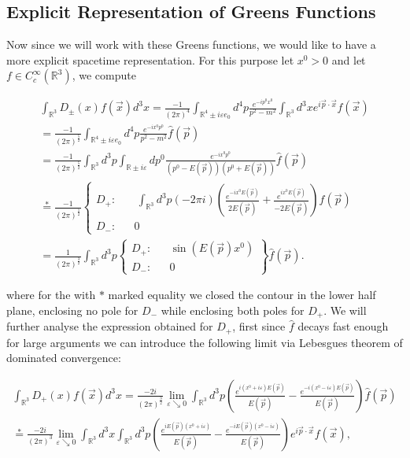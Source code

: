 \documentclass[a4paper,11pt]{article}
\begin{document}
\subsection{Explicit Representation of Greens Functions}

Now since we will work with these Greens functions, we would like to have a more explicit spacetime representation. 
For this purpose let \(x^0>0\) and let \(f\in C_c^\infty (\mathbb{R}^3)\), we compute

\begin{align}
\int_{\mathbb{R}^3} D_\pm (x) f(\vec{x})d^3x = \frac{-1}{(2\pi)^4} \int_{\mathbb{R}^4\pm i \varepsilon e_0} d^4p \frac{e^{-ip^0 x^0}}{p^2-m^2} \int_{\mathbb{R}^3} d^3x e^{i\vec{p}\cdot \vec{x}} f(\vec{x})\\
=\frac{-1}{(2\pi)^{\frac{5}{2}}} \int_{\mathbb{R}^4\pm i \varepsilon e_0} d^4p \frac{e^{-ix^0 p^0}}{p^2-m^2}\hat{f}(\vec{p})\\
=\frac{-1}{(2\pi)^{\frac{5}{2}}} \int_{\mathbb{R}^3} d^3p \int_{\mathbb{R}\pm i \varepsilon}dp^0 \frac{e^{-ix^0 p^0}}{(p^0-E(\vec{p}))(p^0+E(\vec{p}))}\hat{f}(\vec{p})\\\label{time sign change}
\overset{*}{=}\frac{-1}{(2\pi)^{\frac{5}{2}}}  \left\{\begin{matrix}D_+:&&~ \int_{\mathbb{R}^3}d^3p  (-2\pi i)\left(\frac{e^{-ix^0 E(\vec{p})}}{2E(\vec{p})}+\frac{e^{ix^0 E(\vec{p})}}{-2E(\vec{p})} \right) \hat{f}(\vec{p})
\\D_-:&& 0 \end{matrix} \right.\\
=\frac{1}{(2\pi)^{\frac{3}{2}}} \int_{\mathbb{R}^3} d^3p\left\{ \begin{matrix}D_+: &&\sin(E(\vec{p})x^0)\\D_-:  &&0 \end{matrix}\right\} \hat{f}(\vec{p}).
\end{align}

where for the with \(*\) marked equality we closed the contour in the lower half plane, enclosing no pole for \(D_-\) while enclosing both
poles for \(D_+\). We will further analyse the expression obtained for \(D_+\), first since \(\hat{f}\) decays 
fast enough for large arguments we can introduce 
the following limit via Lebesgues theorem of dominated convergence:

\begin{align}
\int_{\mathbb{R}^3} D_+ (x) f(\vec{x})d^3x =\frac{-2i}{(2\pi)^{\frac{3}{2}}} \lim_{\varepsilon \searrow 0}\int_{\mathbb{R}^3} d^3p
\left( \frac{e^{i (x^0+i \varepsilon) E(\vec{p})}}{E(\vec{p})} - \frac{e^{-i (x^0-i \varepsilon)E(\vec{p})}}{E(\vec{p})} \right) \hat{f}(\vec{p})\\
\overset{*}{=} \frac{-2i}{(2\pi)^{3}} \lim_{\varepsilon \searrow 0}  \int_{\mathbb{R}^3} d^3 x \int_{\mathbb{R}^3} d^3 p 
\left( \frac{e^{i E(\vec{p})(x^0+i\varepsilon)}}{E(\vec{p})} 
-\frac{e^{-i E(\vec{p})(x^0-i\varepsilon)}}{E(\vec{p})} \right)e^{i\vec{p}\cdot \vec{x}}f(\vec{x}),
\end{align}
\end{document}
